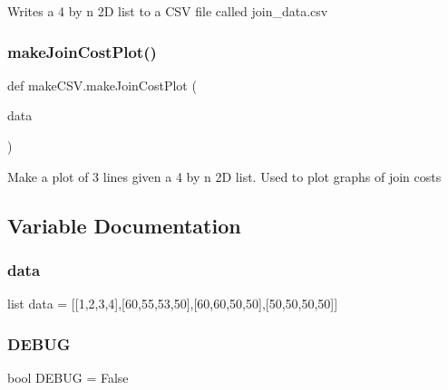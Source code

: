 \begin{DoxyVerb}Writes a 4 by n 2D list to a CSV file called join_data.csv \end{DoxyVerb}
 \mbox{\label{namespacemake_c_s_v_aae06ec5a9c945ceb7cf58ed6874d6ed8}} 
\subsubsection{\texorpdfstring{makeJoinCostPlot()}{makeJoinCostPlot()}}
{\footnotesize\ttfamily def make\+C\+S\+V.\+make\+Join\+Cost\+Plot (\begin{DoxyParamCaption}\item[{}]{data }\end{DoxyParamCaption})}

\begin{DoxyVerb}Make a plot of 3 lines given a 4 by n 2D list. Used to plot graphs of join costs \end{DoxyVerb}
 

\subsection{Variable Documentation}
\mbox{\label{namespacemake_c_s_v_a018aaab493af92ea83348b0db6e32328}} 
\subsubsection{\texorpdfstring{data}{data}}
{\footnotesize\ttfamily list data = \mbox{[}\mbox{[}1,2,3,4\mbox{]},\mbox{[}60,55,53,50\mbox{]},\mbox{[}60,60,50,50\mbox{]},\mbox{[}50,50,50,50\mbox{]}\mbox{]}}

\mbox{\label{namespacemake_c_s_v_a117352cc494cc62c6b2f1882786a332c}} 
\subsubsection{\texorpdfstring{DEBUG}{DEBUG}}
{\footnotesize\ttfamily bool D\+E\+B\+UG = False}


